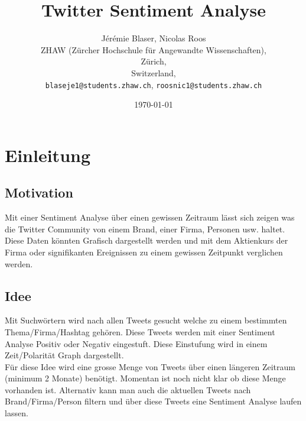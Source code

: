 \documentclass[12pt, oneside]{report}   	%
\title{Twitter Sentiment Analyse}
\author{Jérémie Blaser, Nicolas Roos\\
	ZHAW (Zürcher Hochschule für Angewandte Wissenschaften),\\
	Zürich,\\
	Switzerland,\\
	\texttt{blaseje1@students.zhaw.ch},
	\texttt{roosnic1@students.zhaw.ch}}
\date{\today}							%
\begin{document}
\lstset{language=Python} 
\newcommand{\qem}[1]{\emph{"<#1">}} %

\maketitle




\tableofcontents



\chapter{Einleitung}
\section{Motivation}
Mit einer Sentiment Analyse über einen gewissen Zeitraum lässt sich zeigen was die Twitter Community von einem Brand, einer Firma, Personen usw. haltet. Diese Daten könnten Grafisch dargestellt werden und mit dem Aktienkurs der Firma oder signifikanten Ereignissen zu einem gewissen Zeitpunkt verglichen werden. 
\section{Idee}
Mit Suchwörtern wird nach allen Tweets gesucht welche zu einem bestimmten Thema/Firma/Hashtag gehören. Diese Tweets werden mit einer Sentiment Analyse Positiv oder Negativ eingestuft. Diese Einstufung wird in einem Zeit/Polarität Graph dargestellt. \\
Für diese Idee wird eine grosse Menge von Tweets über einen längeren Zeitraum (minimum 2 Monate) benötigt. Momentan ist noch nicht klar ob diese Menge vorhanden ist. Alternativ kann man auch die aktuellen Tweets nach Brand/Firma/Person filtern und über diese Tweets eine Sentiment Analyse laufen lassen.
\end{document}
